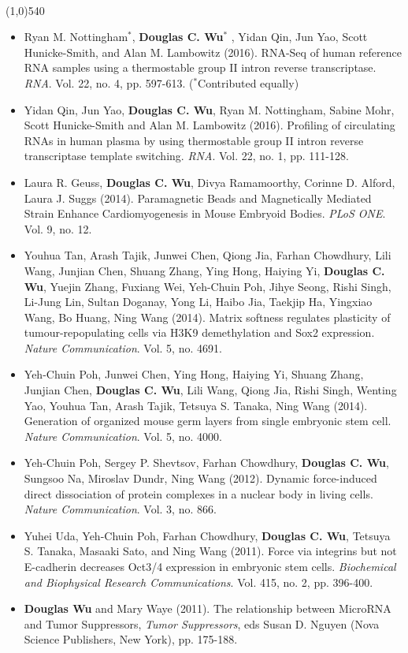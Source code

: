 \documentclass[dvips,11pt]{article}
\begin{document}
 \vspace{-1.5mm}
\noindent\\
\vspace{-6mm}
\line(1,0){540}\\
\begin{itemize}
	\setlength{\itemsep}{2pt}
	\item Ryan M. Nottingham$^*$, {\bf Douglas C. Wu$^*$} , Yidan Qin, Jun Yao, Scott Hunicke-Smith, and Alan M. Lambowitz (2016). RNA-Seq of human reference RNA samples using a thermostable group II intron reverse transcriptase. {\it RNA}. Vol. 22, no. 4, pp. 597-613. ($^*$Contributed equally)
	\item Yidan Qin, Jun Yao, {\bf Douglas C. Wu}, Ryan M. Nottingham, Sabine Mohr, Scott Hunicke-Smith and Alan M. Lambowitz (2016). Profiling of circulating RNAs in human plasma by using thermostable group II intron reverse transcriptase template switching. {\it RNA}. Vol. 22, no. 1, pp. 111-128.
	\item Laura R. Geuss, {\bf Douglas C. Wu}, Divya Ramamoorthy, Corinne D. Alford, Laura J. Suggs (2014). Paramagnetic Beads and Magnetically Mediated Strain Enhance Cardiomyogenesis in Mouse Embryoid Bodies. {\it PLoS ONE}. Vol. 9, no. 12.
	\item Youhua Tan, Arash Tajik, Junwei Chen, Qiong Jia, Farhan Chowdhury, Lili Wang, Junjian Chen, Shuang Zhang, Ying Hong, Haiying Yi, {\bf Douglas C. Wu}, Yuejin Zhang, Fuxiang Wei, Yeh-Chuin Poh, Jihye Seong, Rishi Singh, Li-Jung Lin, Sultan Doganay, Yong Li, Haibo Jia, Taekjip Ha, Yingxiao Wang, Bo Huang, Ning Wang (2014). Matrix softness regulates plasticity of tumour-repopulating cells via H3K9 demethylation and Sox2 expression. {\it Nature Communication}. Vol. 5, no. 4691.
	\item Yeh-Chuin Poh, Junwei Chen, Ying Hong, Haiying Yi, Shuang Zhang, Junjian Chen, {\bf Douglas C. Wu}, Lili Wang, Qiong Jia, Rishi Singh, Wenting Yao, Youhua Tan, Arash Tajik, Tetsuya S. Tanaka, Ning Wang (2014). Generation of organized mouse germ layers from single embryonic stem cell. {\it Nature Communication}. Vol. 5, no. 4000.
	\item Yeh-Chuin Poh, Sergey P. Shevtsov, Farhan Chowdhury, { \bf Douglas C. Wu}, Sungsoo Na, Miroslav Dundr, Ning Wang (2012). Dynamic force-induced direct dissociation of protein complexes in a nuclear body in living cells. {\it Nature Communication}. Vol. 3, no. 866.
	\item Yuhei Uda, Yeh-Chuin Poh, Farhan Chowdhury, { \bf Douglas C. Wu}, Tetsuya S. Tanaka, Masaaki Sato, and Ning Wang (2011). Force via integrins but not E-cadherin decreases Oct3/4 expression in embryonic stem cells. {\it Biochemical and Biophysical Research Communications}. Vol. 415, no. 2, pp. 396-400.
	\item {\bf Douglas Wu} and Mary Waye (2011). The relationship between MicroRNA and Tumor Suppressors, {\it Tumor Suppressors}, eds Susan D. Nguyen (Nova Science Publishers, New York), pp. 175-188.
\end{itemize}
\end{document}
